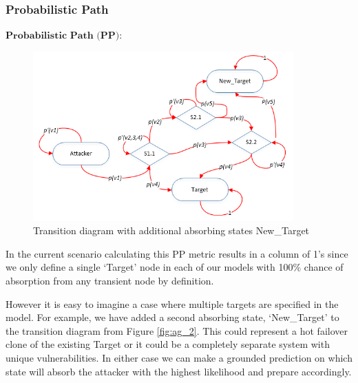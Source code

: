  

\subsubsection{Probabilistic Path}\label{subsec:results:pp}
% 


\(
\textbf{Probabilistic Path (PP):} 
\)


\begin{figure}[H]
\centering
\includegraphics[width=100mm]{resource/img/ch_casestudies/att/ag_extra_target.png}
\caption{Transition diagram with additional absorbing states New\_Target}
\label{fig:ag_pp}
\end{figure}


In the current scenario calculating this PP metric results in a column of 1’s since we only define a single ‘Target’ node in each of our models with 100\% chance of absorption from any transient node by definition.   

However it is easy to imagine a case where multiple targets are specified in the model. For example, we have added a second absorbing state, ‘New\_Target’ to the transition diagram from Figure \ref{fig:ag_2}. This could represent a hot failover clone of the existing Target or it could be a completely separate system with unique vulnerabilities. In either case we can make a grounded prediction on which state will absorb the attacker with the highest likelihood and prepare accordingly. 



 



